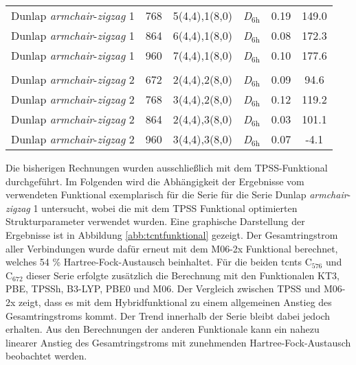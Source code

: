 \begin{table}[htbp!]
{\begin{tabular}{lccccc}
    Dunlap \textit{armchair}-\textit{zigzag} 1& 768   & 5(4,4),1(8,0) & \textit{D}$_{6\text{h}}$   & 0.19  & 149.0 \\
    Dunlap \textit{armchair}-\textit{zigzag} 1& 864   & 6(4,4),1(8,0) & \textit{D}$_{6\text{h}}$   & 0.08  & 172.3 \\
    Dunlap \textit{armchair}-\textit{zigzag} 1& 960   & 7(4,4),1(8,0) & \textit{D}$_{6\text{h}}$   & 0.10  & 177.6 \\
          &       &       &       &       &  \\
    Dunlap \textit{armchair}-\textit{zigzag} 2& 672   & 2(4,4),2(8,0) & \textit{D}$_{6\text{h}}$   & 0.09  & 94.6 \\
    Dunlap \textit{armchair}-\textit{zigzag} 2& 768   & 3(4,4),2(8,0) & \textit{D}$_{6\text{h}}$   & 0.12  & 119.2 \\
    Dunlap \textit{armchair}-\textit{zigzag} 2& 864   & 2(4,4),3(8,0) & \textit{D}$_{6\text{h}}$   & 0.03  & 101.1 \\
    Dunlap \textit{armchair}-\textit{zigzag} 2& 960   & 3(4,4),3(8,0) & \textit{D}$_{6\text{h}}$   & 0.07  & -4.1 \\
    \end{tabular}}%
  \label{tab:tcnt}%
\end{table}%
\FloatBarrier
\newpage
Die bisherigen Rechnungen wurden ausschließlich mit dem TPSS-Funktional durchgeführt. Im Folgenden wird die Abhängigkeit der Ergebnisse vom verwendeten Funktional exemplarisch für die Serie für die Serie \glqq Dunlap \textit{armchair}-\textit{zigzag} 1\grqq{} untersucht, wobei die mit dem TPSS Funktional optimierten Strukturparameter verwendet wurden. Eine graphische Darstellung der Ergebnisse ist in Abbildung \ref{abb:tcntfunktional} gezeigt. Der Gesamtringstrom aller Verbindungen wurde dafür erneut mit dem M06-2x Funktional\supercite{zhao2008m06} berechnet, welches 54 \% Hartree-Fock-Austausch beinhaltet. Für die beiden \acp{tcnt} C$_{576}$ und C$_{672}$ dieser Serie erfolgte zusätzlich die Berechnung mit den Funktionalen KT3\supercite{keal2004semiempirical}, PBE\supercite{perdew1996generalized}, TPSSh\supercite{staroverov2003comparative}, B3-LYP\supercite{becke1993density,lee1988development,stephens1994ab}, PBE0\supercite{adamo1999toward} und M06\supercite{zhao2008m06}. Der Vergleich zwischen TPSS und M06-2x zeigt, dass es mit dem Hybridfunktional zu einem allgemeinen Anstieg des Gesamtringstroms kommt. Der Trend innerhalb der Serie bleibt dabei jedoch erhalten. Aus den Berechnungen der anderen Funktionale kann ein nahezu linearer Anstieg des Gesamtringstroms mit zunehmenden Hartree-Fock-Austausch beobachtet werden.

